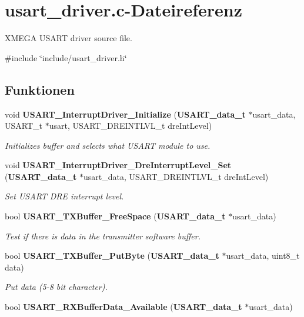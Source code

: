 \section{usart\_\-driver.c-\/Dateireferenz}
\label{usart__driver_8c}


XMEGA USART driver source file.  


{\ttfamily \#include \char`\"{}include/usart\_\-driver.h\char`\"{}}\par
\subsection*{Funktionen}
\begin{DoxyCompactItemize}
\item 
void {\bf USART\_\-InterruptDriver\_\-Initialize} ({\bf USART\_\-data\_\-t} $\ast$usart\_\-data, USART\_\-t $\ast$usart, USART\_\-DREINTLVL\_\-t dreIntLevel)
\begin{DoxyCompactList}\small\item\em Initializes buffer and selects what USART module to use. \item\end{DoxyCompactList}\item 
void {\bf USART\_\-InterruptDriver\_\-DreInterruptLevel\_\-Set} ({\bf USART\_\-data\_\-t} $\ast$usart\_\-data, USART\_\-DREINTLVL\_\-t dreIntLevel)
\begin{DoxyCompactList}\small\item\em Set USART DRE interrupt level. \item\end{DoxyCompactList}\item 
bool {\bf USART\_\-TXBuffer\_\-FreeSpace} ({\bf USART\_\-data\_\-t} $\ast$usart\_\-data)
\begin{DoxyCompactList}\small\item\em Test if there is data in the transmitter software buffer. \item\end{DoxyCompactList}\item 
bool {\bf USART\_\-TXBuffer\_\-PutByte} ({\bf USART\_\-data\_\-t} $\ast$usart\_\-data, uint8\_\-t data)
\begin{DoxyCompactList}\small\item\em Put data (5-\/8 bit character). \item\end{DoxyCompactList}\item 
bool {\bf USART\_\-RXBufferData\_\-Available} ({\bf USART\_\-data\_\-t} $\ast$usart\_\-data)

\end{DoxyCompactItemize}

